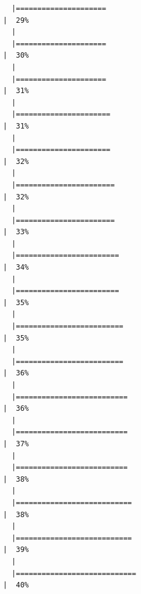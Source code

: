 \documentclass[
  letterpaper,
  DIV=11,
  numbers=noendperiod]{scrreprt}
\begin{document}
\begin{verbatim}
  |=====================                                                 |  29%
  |                                                                            
  |=====================                                                 |  30%
  |                                                                            
  |=====================                                                 |  31%
  |                                                                            
  |======================                                                |  31%
  |                                                                            
  |======================                                                |  32%
  |                                                                            
  |=======================                                               |  32%
  |                                                                            
  |=======================                                               |  33%
  |                                                                            
  |========================                                              |  34%
  |                                                                            
  |========================                                              |  35%
  |                                                                            
  |=========================                                             |  35%
  |                                                                            
  |=========================                                             |  36%
  |                                                                            
  |==========================                                            |  36%
  |                                                                            
  |==========================                                            |  37%
  |                                                                            
  |==========================                                            |  38%
  |                                                                            
  |===========================                                           |  38%
  |                                                                            
  |===========================                                           |  39%
  |                                                                            
  |============================                                          |  40%

\end{verbatim}
\end{document}

